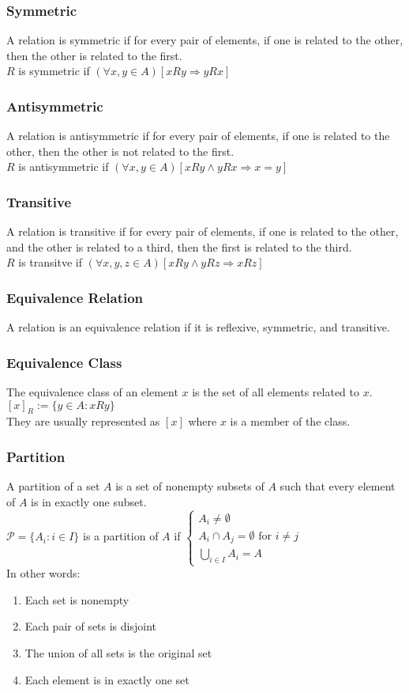 \documentclass{article}
\begin{document}
\subsubsection*{Symmetric}
A relation is symmetric if for every pair of elements, if one is related to the other, then the other is related to the first.\\
$R$ is symmetric if $(\forall x,y \in A)[xRy \Rightarrow yRx]$
\subsubsection*{Antisymmetric}
A relation is antisymmetric if for every pair of elements, if one is related to the other, then the other is not related to the first.\\
$R$ is antisymmetric if $(\forall x,y \in A)[xRy \wedge yRx \Rightarrow x = y]$
\subsubsection*{Transitive}
A relation is transitive if for every pair of elements, if one is related to the other, and the other is related to a third, then the first is related to the third.\\
$R$ is transitve if $(\forall x,y,z \in A)[xRy \wedge yRz \Rightarrow xRz]$
\subsubsection*{Equivalence Relation}
A relation is an equivalence relation if it is reflexive, symmetric, and transitive.\\
\subsubsection*{Equivalence Class}
The equivalence class of an element $x$ is the set of all elements related to $x$.\\
$[x]_R := \{y \in A : xRy\}$\\
They are usually represented as $[x]$ where $x$ is a member of the class.\\
\subsubsection*{Partition}
A partition of a set $A$ is a set of nonempty subsets of $A$ such that every element of $A$ is in exactly one subset.\\
$\mathscr{P} = \{A_i : i \in I\}$ is a partition of $A$ if $\begin{cases}
    A_i \neq \emptyset\\
    A_i \cap A_j = \emptyset \text{ for } i \neq j\\
    \bigcup_{i \in I} A_i = A
\end{cases}$\\
In other words: \begin{enumerate}
    \item Each set is nonempty
    \item Each pair of sets is disjoint
    \item The union of all sets is the original set 
    \item Each element is in exactly one set
\end{enumerate}
\end{document}
